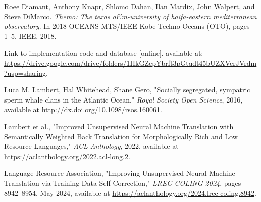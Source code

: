 \documentclass{article}
\begin{document}
\begin{thebibliography}{9}

Roee Diamant, Anthony Knapr, Shlomo Dahan, Ilan Mardix, John Walpert, and Steve DiMarco. 
\textit{Themo: The texas a\&m-university of haifa-eastern mediterranean observatory}. 
In 2018 OCEANS-MTS/IEEE Kobe Techno-Oceans (OTO), pages 1–5. IEEE, 2018.

Link to implementation code and database [online]. available at: 
\url{https://drive.google.com/drive/folders/1HkGZcpYbrft3pGtqdt45bUZXVcrJVrdm?usp=sharing}.

Luca M. Lambert, Hal Whitehead, Shane Gero, "Socially segregated, sympatric sperm whale clans in the Atlantic Ocean," \textit{Royal Society Open Science}, 2016, available at \url{http://dx.doi.org/10.1098/rsos.160061}.

Lambert et al., "Improved Unsupervised Neural Machine Translation with Semantically Weighted Back Translation for Morphologically Rich and Low Resource Languages," \textit{ACL Anthology}, 2022, available at \url{https://aclanthology.org/2022.acl-long.2}.

Language Resource Association, "Improving Unsupervised Neural Machine Translation via Training Data Self-Correction," \textit{LREC-COLING 2024}, pages 8942–8954, May 2024, available at \url{https://aclanthology.org/2024.lrec-coling.8942}.


\end{thebibliography}
\end{document}
